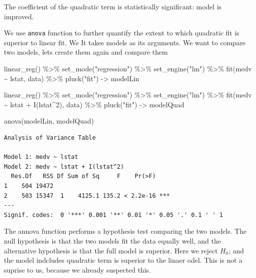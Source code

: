\documentclass[
  letterpaper,
  DIV=11,
  numbers=noendperiod]{scrreprt}
\newenvironment{Shaded}{\begin{snugshade}}{\end{snugshade}}
\newcommand{\DecValTok}[1]{\textcolor[rgb]{0.47,0.16,0.63}{#1}}
\newcommand{\FunctionTok}[1]{\textcolor[rgb]{0.02,0.16,0.49}{#1}}
\newcommand{\NormalTok}[1]{\textcolor[rgb]{0.33,0.33,0.33}{#1}}
\newcommand{\OtherTok}[1]{\textcolor[rgb]{0.85,0.12,0.09}{#1}}
\newcommand{\SpecialCharTok}[1]{\textcolor[rgb]{0.00,0.46,0.62}{#1}}
\newcommand{\StringTok}[1]{\textcolor[rgb]{0.00,0.50,0.00}{#1}}
\begin{document}
The coefficient of the quadratic term is statistically significant:
model is improved.

We use \texttt{anova} function to further quantify the extent to which
quadratic fit is superior to linear fit. We It takes models as its
arguments. We want to compare two models, lets create them again and
compare them

\begin{Shaded}
\begin{Highlighting}[]
\FunctionTok{linear\_reg}\NormalTok{() }\SpecialCharTok{\%\textgreater{}\%} 
  \FunctionTok{set\_mode}\NormalTok{(}\StringTok{"regression"}\NormalTok{) }\SpecialCharTok{\%\textgreater{}\%} 
  \FunctionTok{set\_engine}\NormalTok{(}\StringTok{"lm"}\NormalTok{) }\SpecialCharTok{\%\textgreater{}\%} 
  \FunctionTok{fit}\NormalTok{(medv }\SpecialCharTok{\textasciitilde{}}\NormalTok{ lstat, data) }\SpecialCharTok{\%\textgreater{}\%} 
  \FunctionTok{pluck}\NormalTok{(}\StringTok{"fit"}\NormalTok{) }\OtherTok{{-}\textgreater{}}\NormalTok{ modelLin}

\FunctionTok{linear\_reg}\NormalTok{() }\SpecialCharTok{\%\textgreater{}\%} 
  \FunctionTok{set\_mode}\NormalTok{(}\StringTok{"regression"}\NormalTok{) }\SpecialCharTok{\%\textgreater{}\%} 
  \FunctionTok{set\_engine}\NormalTok{(}\StringTok{"lm"}\NormalTok{) }\SpecialCharTok{\%\textgreater{}\%} 
  \FunctionTok{fit}\NormalTok{(medv }\SpecialCharTok{\textasciitilde{}}\NormalTok{ lstat }\SpecialCharTok{+} \FunctionTok{I}\NormalTok{(lstat}\SpecialCharTok{\^{}}\DecValTok{2}\NormalTok{), data) }\SpecialCharTok{\%\textgreater{}\%} 
  \FunctionTok{pluck}\NormalTok{(}\StringTok{"fit"}\NormalTok{) }\OtherTok{{-}\textgreater{}}\NormalTok{ modelQuad}

\FunctionTok{anova}\NormalTok{(modelLin, modelQuad)}
\end{Highlighting}
\end{Shaded}

\begin{verbatim}
Analysis of Variance Table

Model 1: medv ~ lstat
Model 2: medv ~ lstat + I(lstat^2)
  Res.Df   RSS Df Sum of Sq     F    Pr(>F)    
1    504 19472                                 
2    503 15347  1    4125.1 135.2 < 2.2e-16 ***
---
Signif. codes:  0 '***' 0.001 '**' 0.01 '*' 0.05 '.' 0.1 ' ' 1
\end{verbatim}

The annova function performs a hypothesis test comparing the two models.
The null hypothesis is that the two models fit the data equally well,
and the alternative hypothesis is that the full model is superior. Here
we reject \(H_0\); and the model indcludes quadratic term is superior to
the linaer odel. This is not a suprise to us, because we already
suspected this.
\end{document}
